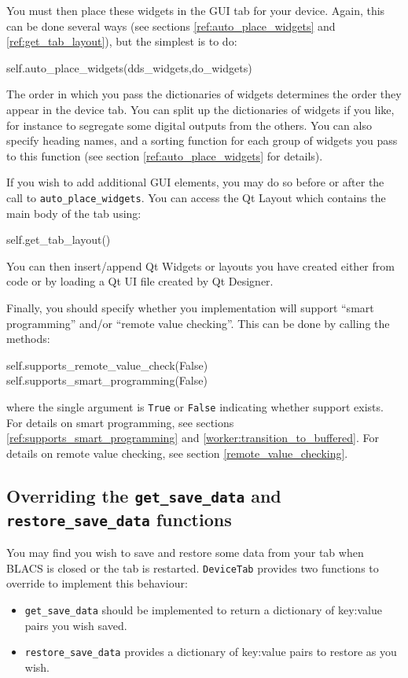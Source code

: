 \documentclass[12pt]{article}
\begin{document}
You must then place these widgets in the GUI tab for your device.
Again, this can be done several ways (see sections \ref{ref:auto_place_widgets} and \ref{ref:get_tab_layout}), but the simplest is to do:
\begin{python}
    self.auto_place_widgets(dds_widgets,do_widgets)
\end{python}
The order in which you pass the dictionaries of widgets determines the order they appear in the device tab.
You can split up the dictionaries of widgets if you like, for instance to segregate some digital outputs from the others.
You can also specify heading names, and a sorting function for each group of widgets you pass to this function (see section \ref{ref:auto_place_widgets} for details).

If you wish to add additional GUI elements, you may do so before or after the call to \texttt{auto\_place\_widgets}.
You can access the Qt Layout which contains the main body of the tab using:
\begin{python}
    self.get_tab_layout()
\end{python}
You can then insert/append Qt Widgets or layouts you have created either from code or by loading a Qt UI file created by Qt Designer.

Finally, you should specify whether you implementation will support ``smart programming'' and/or ``remote value checking''.
This can be done by calling the methods:
\begin{python}
    self.supports_remote_value_check(False)
    self.supports_smart_programming(False) 
\end{python}
where the single argument is \texttt{True} or \texttt{False} indicating whether support exists.
For details on smart programming, see sections \ref{ref:supports_smart_programming} and \ref{worker:transition_to_buffered}.
For details on remote value checking, see section \ref{remote_value_checking}.

\subsection{Overriding the \texttt{get\_save\_data} and \texttt{restore\_save\_data} functions}\label{tutorial:save_data}
You may find you wish to save and restore some data from your tab when BLACS is closed or the tab is restarted.
\texttt{DeviceTab} provides two functions to override to implement this behaviour:


\begin{itemize}
	\item \texttt{get\_save\_data} should be implemented to return a dictionary of key:value pairs you wish saved.

  \item \texttt{restore\_save\_data} provides a dictionary of key:value pairs to restore as you wish.
\end{itemize}
\end{document}
